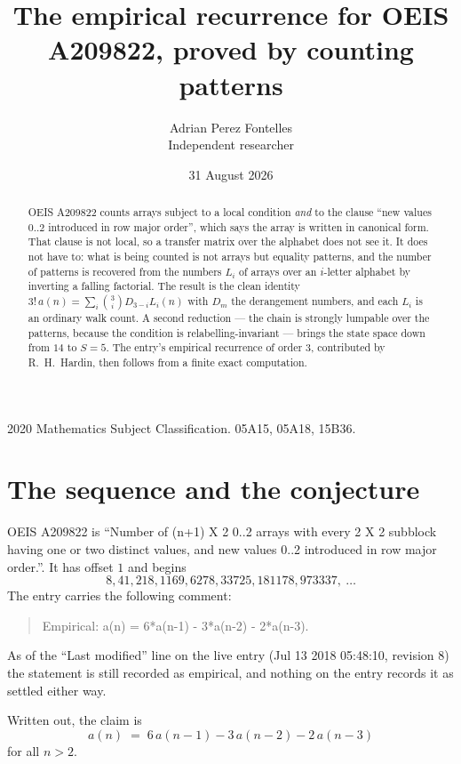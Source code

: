 \documentclass[11pt,a4paper]{article}
\title{The empirical recurrence for OEIS A209822, proved by counting patterns}
\author{Adrian Perez Fontelles\\ \small Independent researcher}
\date{31 August 2026}
\theoremstyle{plain}
\theoremstyle{definition}
\begin{document}
\maketitle

\begin{abstract}
OEIS A209822 counts arrays subject to a local condition \emph{and} to the clause ``new values
$0..2$ introduced in row major order'', which says the array is written in canonical
form. That clause is not local, so a transfer matrix over the alphabet does not see it. It
does not have to: what is being counted is not arrays but equality patterns, and the number
of patterns is recovered from the numbers $L_i$ of arrays over an $i$-letter alphabet by
inverting a falling factorial. The result is the clean identity
$3!\,a(n)=\sum_i\binom{3}{i}D_{3-i}L_i(n)$ with $D_m$ the derangement numbers,
and each $L_i$ is an ordinary walk count. A second reduction --- the chain is strongly
lumpable over the patterns, because the condition is relabelling-invariant --- brings the
state space down from $14$ to $S=5$. The entry's empirical recurrence of order
$3$, contributed by R.~H.~Hardin, then follows from a finite exact computation.
\end{abstract}

\noindent\small 2020 Mathematics Subject Classification. 05A15, 05A18, 15B36.\normalsize

\section{The sequence and the conjecture}

OEIS A209822 is ``Number of (n+1) X 2 0..2 arrays with every 2 X 2 subblock having one or two distinct values, and new values 0..2 introduced in row major order.''. It has offset $1$ and begins
\[
8, 41, 218, 1169, 6278, 33725, 181178, 973337,\ \dots
\]
The entry carries the following comment:
\begin{quote}\small
Empirical: a(n) = 6*a(n-1) - 3*a(n-2) - 2*a(n-3).
\end{quote}
As of the ``Last modified'' line on the live entry (Jul 13 2018 05:48:10, revision 8) the statement is
still recorded as empirical, and nothing on the entry records it as settled either way.

Written out, the claim is
\begin{equation}\label{eq:conj}
a(n)\;=\;6\,a(n-1) - 3\,a(n-2) - 2\,a(n-3)
\end{equation}
for all $n>2$.
\end{document}
